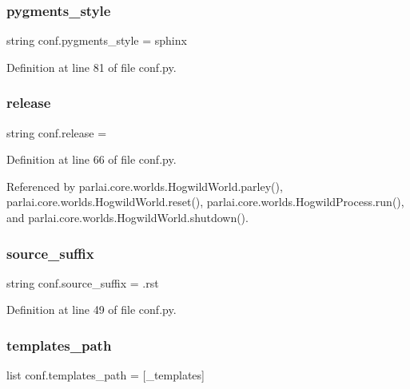\subsubsection{\texorpdfstring{pygments\+\_\+style}{pygments\_style}}
{\footnotesize\ttfamily string conf.\+pygments\+\_\+style = \textquotesingle{}sphinx\textquotesingle{}}



Definition at line 81 of file conf.\+py.

\mbox{\label{namespaceconf_a325dc746d8bf05c54d26351c35a21d90}} 
\subsubsection{\texorpdfstring{release}{release}}
{\footnotesize\ttfamily string conf.\+release = \textquotesingle{}\textquotesingle{}}



Definition at line 66 of file conf.\+py.



Referenced by parlai.\+core.\+worlds.\+Hogwild\+World.\+parley(), parlai.\+core.\+worlds.\+Hogwild\+World.\+reset(), parlai.\+core.\+worlds.\+Hogwild\+Process.\+run(), and parlai.\+core.\+worlds.\+Hogwild\+World.\+shutdown().

\mbox{\label{namespaceconf_a10af2a769eb3bd3322e874f677e435b1}} 
\subsubsection{\texorpdfstring{source\+\_\+suffix}{source\_suffix}}
{\footnotesize\ttfamily string conf.\+source\+\_\+suffix = \textquotesingle{}.rst\textquotesingle{}}



Definition at line 49 of file conf.\+py.

\mbox{\label{namespaceconf_ae850ae634911b713e036b43894fdd525}} 
\subsubsection{\texorpdfstring{templates\+\_\+path}{templates\_path}}
{\footnotesize\ttfamily list conf.\+templates\+\_\+path = \mbox{[}\textquotesingle{}\+\_\+templates\textquotesingle{}\mbox{]}}



